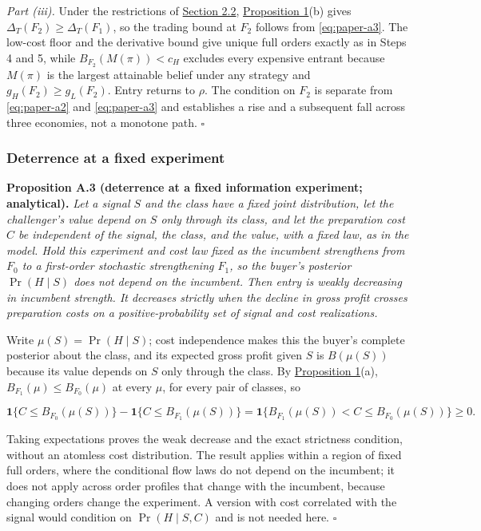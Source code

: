 \emph{Part (iii).} Under the restrictions of
\hyperref[sec-values-preparation-and-the-sale]{Section 2.2},
\hyperref[result-proposition-1]{Proposition 1}(b) gives
\(\Delta_T(F_2)\ge\Delta_T(F_1)\), so the trading bound at \(F_2\)
follows from \eqref{eq:paper-a3}. The low-cost floor and the derivative
bound give unique full orders exactly as in Steps 4 and 5, while
\(B_{F_2}(M(\pi))<c_H\) excludes every expensive entrant because
\(M(\pi)\) is the largest attainable belief under any strategy and
\(g_H(F_2)\ge g_L(F_2)\). Entry returns to \(\rho\). The condition on
\(F_2\) is separate from \eqref{eq:paper-a2} and \eqref{eq:paper-a3}
and establishes a rise and a subsequent fall across three economies, not
a monotone path. \(\square\)


\subsubsection{Deterrence at a fixed
experiment}\label{deterrence-at-a-fixed-experiment}

\protect{}\label{result-proposition-a-3}{\textbf{Proposition
A.3 (deterrence at a fixed information experiment; analytical).}}
\emph{Let a signal \(S\) and the class have a fixed joint distribution,
let the challenger's value depend on \(S\) only through its class, and
let the preparation cost \(C\) be independent of the signal, the class,
and the value, with a fixed law, as in the model. Hold this experiment
and cost law fixed as the incumbent strengthens from \(F_0\) to a
first-order stochastic strengthening \(F_1\), so the buyer's posterior
\(\Pr(H\mid S)\) does not depend on the incumbent. Then entry is weakly
decreasing in incumbent strength. It decreases strictly when the decline
in gross profit crosses preparation costs on a positive-probability set
of signal and cost realizations.}

Write \(\mu(S)=\Pr(H\mid S)\); cost independence makes this the buyer's
complete posterior about the class, and its expected gross profit given
\(S\) is \(B(\mu(S))\) because its value depends on \(S\) only through
the class. By \hyperref[result-proposition-1]{Proposition 1}(a),
\(B_{F_1}(\mu)\le B_{F_0}(\mu)\) at every \(\mu\), for every pair of
classes, so

\[
\mathbf1\{C\le B_{F_0}(\mu(S))\}-\mathbf1\{C\le B_{F_1}(\mu(S))\}
=\mathbf1\{B_{F_1}(\mu(S))<C\le B_{F_0}(\mu(S))\}\ge0.
\tag{A.9}\label{eq:paper-a-9}
\]

Taking expectations proves the weak decrease and the exact strictness
condition, without an atomless cost distribution. The result applies
within a region of fixed full orders, where the conditional flow laws do
not depend on the incumbent; it does not apply across order profiles
that change with the incumbent, because changing orders change the
experiment. A version with cost correlated with the signal would
condition on \(\Pr(H\mid S,C)\) and is not needed here. \(\square\)

